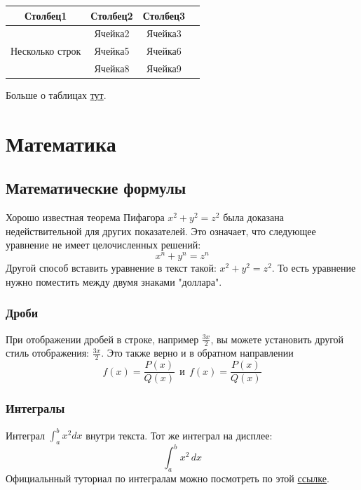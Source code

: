 \begin{center} %
\begin{tabular}{ |c|c|c|c| } %
\hline
Столбец1 & Столбец2 & Столбец3 \\ %
\hline
\multirow{3}{5em}{Несколько строк} & Ячейка2 & Ячейка3 \\ 
& Ячейка5 & Ячейка6 \\ %
& Ячейка8 & Ячейка9 \\ 
\hline %
\end{tabular}
\end{center}

Больше о таблицах \href{https://www.overleaf.com/learn/latex/Tables}{тут}.

\section{Математика}

    \subsection{Математические формулы}
    Хорошо известная теорема Пифагора \(x^2 + y^2 = z^2\) была
    доказана недействительной для других показателей.
    Это означает, что следующее уравнение не имеет целочисленных решений:
    \[ x^n + y^n = z^n \]
    Другой способ вставить уравнение в текст такой: $x^2 + y^2 = z^2$. То есть уравнение нужно поместить между двумя знаками "доллара".

    \subsubsection{Дроби}
    При отображении дробей в строке, например \(\frac{3x}{2}\),
    вы можете установить другой стиль отображения:
    \( \displaystyle \frac{3x}{2} \).
    Это также верно и в обратном направлении
    \[ f(x)=\frac{P(x)}{Q(x)} \ \ \textrm{и}
    \ \ f(x)=\textstyle\frac{P(x)}{Q(x)} \]

    \subsubsection{Интегралы}
    Интеграл \(\int_{a}^{b} x^2 dx\) внутри текста.
    \medskip
    Тот же интеграл на дисплее:
    \[
    \int_{a}^{b} x^2 \,dx
    \]
    Официальнный туториал по интегралам можно посмотреть по этой  \href{https://www.overleaf.com/learn/latex/Integrals,_sums_and_limits#Integrals}{ссылке}.

